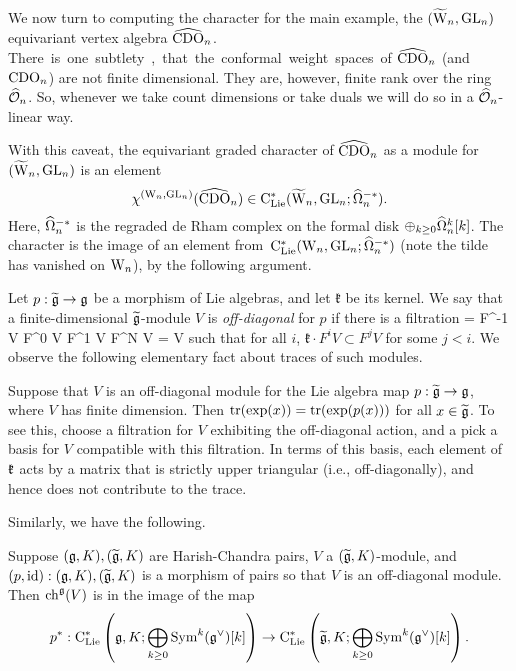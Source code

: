 \subsubsection{} 

We now turn to computing the character for the main example, the $(\widetilde{{{\rm W}}}_n,{\rm GL}_n)$
equivariant vertex algebra $\widehat{\rm CDO}_n$. 
\si
There is one subtlety, that the conformal weight spaces of $\widehat{\rm CDO}_n$ (and ${\rm CDO}_n$) are not finite dimensional. 
They are, however, finite rank over the ring $\widehat{\mathcal O}_n$. 
So, whenever we take count dimensions or take duals we will do so in a $\widehat{\mathcal O}_n$-linear way.

With this caveat, the equivariant graded character of $\widehat{\rm CDO}_n$ as a module for $(\widetilde{{{\rm W}}}_n, {\rm GL}_n)$ is an element 
\[
\chi^{({{\rm W}_n}, {\rm GL}_n)} (\widehat{\rm CDO}_n) \in {\rm C}_{{\rm Lie}}^*(\widetilde{{{\rm W}}}_n , {\rm GL}_n ; \widehat{\Omega}^{-*}_n). 
\]
Here, $\widehat{\Omega}^{-*}_n$ is the regraded de Rham complex on the formal disk $\oplus_{k \geq 0} \widehat{\Omega}^k_n [k]$. 
The character is the image of an element from~${\rm C}_{{\rm Lie}}^*({{\rm W}_n} , {\rm GL}_n ; \widehat{\Omega}^{-*}_n)$ (note the tilde has vanished on ${{\rm W}_n}$),
by the following argument.

Let $p : \widetilde{\mathfrak g} \to \mathfrak g$ be a morphism of Lie algebras, and let $\mathfrak{k}$ be its kernel. 
We say that a finite-dimensional $\widetilde{\mathfrak g}$-module $V$ is {\em off-diagonal} for $p$ if there is a filtration 
 = F^{-1} V \subset F^0 V \subset F^1 V \subset \cdots \subset F^N V = V
\een
such that for all $i$, $\mathfrak{k} \cdot F^i V \subset F^{j} V$ for some $j < i$. We observe the following elementary fact about traces of such modules.

Suppose that $V$ is an off-diagonal module for the Lie algebra map $p : \widetilde{\mathfrak g} \to \mathfrak g$,
where $V$ has finite dimension. 
Then ${\rm tr}(\exp(x)) = \operatorname{tr}(\exp(p(x)))$ for all $x \in \widetilde{\mathfrak g}$. 
To see this, choose a filtration for $V$ exhibiting the off-diagonal action, and a pick a basis for $V$ compatible with this filtration. 
In terms of this basis, each element of $\frak{k}$ acts by a matrix that is strictly upper triangular (i.e., off-diagonally), and hence does not contribute to the trace. 

Similarly, we have the following.

\begin{lemma}\label{lem: offdiag}
Suppose $(\mathfrak g, K), (\widetilde{\mathfrak g}, K)$ are Harish-Chandra pairs, $V$ a $(\widetilde{\mathfrak g},K)$-module, and $(p, {\rm id}) : (\mathfrak g, K), (\widetilde{\mathfrak g}, K)$ is a morphism of pairs so that $V$ is an off-diagonal module.
Then ${\rm ch}^\mathfrak g(V)$ is in the image of the map
\[
p^* : {\rm C}_{{\rm Lie}}^*\left(\mathfrak g,K ; \bigoplus_{k \geq 0} {\rm Sym}^k (\mathfrak g^\vee)[k]\right) \to  {\rm C}_{{\rm Lie}}^*\left(\widetilde{\mathfrak g},K ; \bigoplus_{k \geq 0} {\rm Sym}^k (\mathfrak g^\vee)[k]\right) .
\]
\end{lemma}

